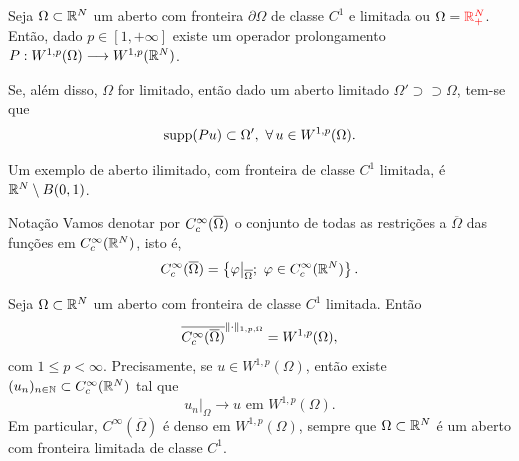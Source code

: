 \begin{frame}
	\begin{teo}
		Seja $\Omega\subset \mathbb{R}^N$ um {\color{red} aberto com fronteira $\partial \Omega$ {de classe $C^1$} e limitada } ou \(\Omega={\color{red} \mathbb{R}^N_{+} }\). Então, dado \( p\in [1,+\infty]\) existe um operador prolongamento $P:W^{1,p}(\Omega)\longrightarrow W^{1,p}(\mathbb{R}^N)$.
		\medskip
		
		Se, além disso, {\color{red} \(\Omega\) for limitado}, então dado um {\color{red} aberto limitado  } \(\Omega' \supset\supset \Omega \), tem-se que
		\[ \supp(Pu)\subset \Omega',\ \forall\, u\in W^{1,p}(\Omega). \]
	\end{teo}

\begin{obs}
Um exemplo de aberto {\color{blue} ilimitado},  com fronteira de classe \(C^1\) limitada, é \(\mathbb{R}^N\setminus B(0,1)\). 
\end{obs}
\end{frame}

\begin{frame}
\begin{block}{Notação}
Vamos denotar por \(C^\infty_c(\overline{\Omega})\) o conjunto de todas as restrições a \(\overline{\Omega}\) das funções em \(C^\infty_c(\mathbb{R}^N)\), isto é, 
\[
C^\infty_c(\overline{\Omega})=\left\{ \varphi\big\vert_{\overline{\Omega}};\ \varphi\in C^\infty_c(\mathbb{R}^N)  \right\}.
\] 
\end{block}


	\begin{corol}
Seja \(\Omega\subset \mathbb{R}^N \) um aberto {\color{red} com fronteira de classe \(C^1\) limitada}. Então
\[
\overline{C^\infty_c(\overline{\Omega})}^{\|\cdot\|_{1,p,\Omega}}=W^{1,p}(\Omega),
\]
com \(1\leq p<\infty\). Precisamente, se \(u\in W^{1,p}(\Omega)\), então existe \((u_n)_{n\in \mathbb{N}}\subset C^\infty_c(\mathbb{R}^N)\) tal que 
\[u_n\big\vert_\Omega\longrightarrow u \text{ em } W^{1,p}(\Omega).\]
Em particular, \(C^\infty(\overline{\Omega})\) é denso em \(W^{1,p}(\Omega)\), sempre que \(\Omega\subset \mathbb{R}^N \) é um aberto  {\color{red} com fronteira limitada de classe \(C^1\)}.
	\end{corol}
	
\end{frame}

